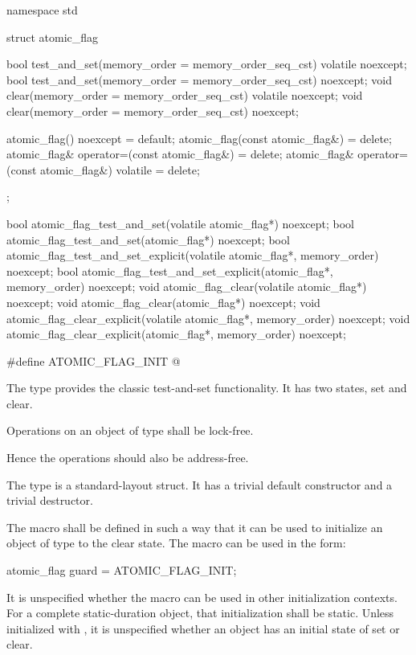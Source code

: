 \begin{codeblock}
namespace std {
  struct atomic_flag {
    bool test_and_set(memory_order = memory_order_seq_cst) volatile noexcept;
    bool test_and_set(memory_order = memory_order_seq_cst) noexcept;
    void clear(memory_order = memory_order_seq_cst) volatile noexcept;
    void clear(memory_order = memory_order_seq_cst) noexcept;

    atomic_flag() noexcept = default;
    atomic_flag(const atomic_flag&) = delete;
    atomic_flag& operator=(const atomic_flag&) = delete;
    atomic_flag& operator=(const atomic_flag&) volatile = delete;
  };

  bool atomic_flag_test_and_set(volatile atomic_flag*) noexcept;
  bool atomic_flag_test_and_set(atomic_flag*) noexcept;
  bool atomic_flag_test_and_set_explicit(volatile atomic_flag*, memory_order) noexcept;
  bool atomic_flag_test_and_set_explicit(atomic_flag*, memory_order) noexcept;
  void atomic_flag_clear(volatile atomic_flag*) noexcept;
  void atomic_flag_clear(atomic_flag*) noexcept;
  void atomic_flag_clear_explicit(volatile atomic_flag*, memory_order) noexcept;
  void atomic_flag_clear_explicit(atomic_flag*, memory_order) noexcept;

  #define ATOMIC_FLAG_INIT @\seebelow@
}
\end{codeblock}

\pnum
The  type provides the classic test-and-set functionality. It has two states, set and clear.

\pnum
Operations on an object of type  shall be lock-free. \begin{note} Hence
the operations should also be address-free. \end{note}

\pnum
The  type is a standard-layout struct.
It has a trivial default constructor and a trivial destructor.

\pnum
The macro  shall be defined in such a way that it can be used to initialize an object of type  to the
clear state. The macro can be used in the form:
\begin{codeblock}
atomic_flag guard = ATOMIC_FLAG_INIT;
\end{codeblock}
It is unspecified whether the macro can be used in other initialization contexts.
For a complete static-duration object, that initialization shall be static.
Unless initialized with , it is unspecified whether an
 object has an initial state of set or clear.

